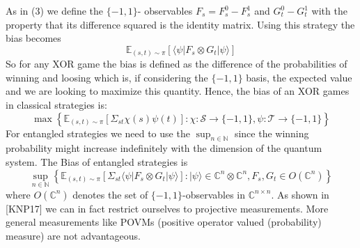 As in (3) we define the $\{ -1, 1 \}$- observables $F_s = F_s^0 - F_s^1$ and $G_t^0-G_t^1$ with the property that its difference squared is the identity matrix. Using this strategy the bias becomes 
\begin{equation}
\mathbb{E}_{(s,t) \sim \pi} \left[ \langle \psi \vert F_s \otimes G_t \vert \psi \rangle \right]
\end{equation}
So for any XOR game the bias is defined as the difference of the probabilities of winning and loosing which is, if considering the $\{ -1, 1 \}$ basis, the expected value and we are looking to maximize this quantity. Hence, the bias of an XOR games in classical strategies is: 
\begin{equation}
\max \left\lbrace \mathbb{E}_{(s,t) \sim \pi} \left[ \Sigma_{st} \chi (s) \psi (t) \right] : \chi : \mathcal{S} \rightarrow \{ -1, 1 \}, \psi : \mathcal{T} \rightarrow \{-1, 1 \} \right\rbrace
\end{equation} 
For entangled strategies we need to use the $\sup_{n \in \mathbb{N}}$ since the winning probability might increase indefinitely with the dimension of the quantum system. 
The Bias of entangled strategies is 
\begin{equation}
\sup_{n \in \mathbb{N}} \left\lbrace \mathbb{E}_{(s,t) \sim \pi} \left[ \Sigma_{st} \langle \psi \vert F_s \otimes G_t \vert \psi \rangle \right] : \vert \psi \rangle \in \mathbb{C}^{n} \otimes \mathbb{C}^{n} , F_s, G_t \in O(\mathbb{C}^n) \right\rbrace
\end{equation}
where $O(\mathbb{C}^n)$ denotes the set of $\{ -1, 1 \}$-observables in $\mathbb{C}^{n \times n}$. As shown in [KNP17] we can in fact restrict ourselves to projective measurements. More general measurements like POVMs (positive operator valued (probability) measure) are not advantageous. 

